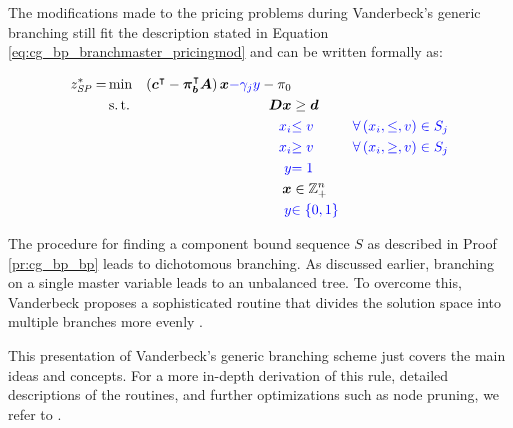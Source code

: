 \begin{note}
The modifications made to the pricing problems during Vanderbeck's generic branching still fit the description stated in Equation \eqref{eq:cg_bp_branchmaster_pricingmod} and can be written formally as:

\begin{equation}
\begin{aligned}
z^*_\SP{} = &\min & \left( \vec{c}\transpose - \vec{\pi}_\vec{b}\transpose \mat{A} \right) \vec{x} {\color{blue} - \gamma_j y} - \pi_0 & \\
&\st & \mat{D} \vec{x} & \geq \vec{d} \\
&& {\color{blue} x_i} & {\color{blue} \leq v} & {\color{blue} \forall \left( x_i, \leq, v \right) \in S_j} \\
&& {\color{blue} x_i} & {\color{blue} \geq v} & {\color{blue} \forall \left( x_i, \geq, v \right) \in S_j} \\
&& {\color{blue} y} & {\color{blue} = 1} \\
&& \vec{x} & \in \mathbb{Z}_+^n \\
&& {\color{blue} y} & {\color{blue} \in \{0, 1\}}
\end{aligned}
\end{equation}
\end{note}

The procedure for finding a component bound sequence $S$ as described in Proof \ref{pr:cg_bp_bp} leads to dichotomous branching. As discussed earlier, branching on a single master variable leads to an unbalanced tree. To overcome this, Vanderbeck proposes a sophisticated routine that divides the solution space into multiple branches more evenly \cite{vanderbeck2011branching}.

This presentation of Vanderbeck's generic branching scheme just covers the main ideas and concepts. For a more in-depth derivation of this rule, detailed descriptions of the routines, and further optimizations such as node pruning, we refer to \cite{vanderbeck1996exact, vanderbeck2010reformulation, vanderbeck2011branching, schmickerath2012experiments}.
